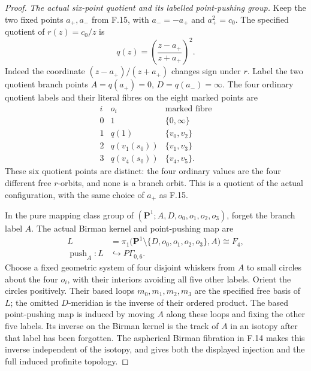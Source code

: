 \begin{proof}
\emph{The actual six-point quotient and its labelled point-pushing group.}
Keep the two fixed points $a_+,a_-$ from F.15,
with $a_-=-a_+$ and $a_+^2=c_0$.
The specified quotient of $r(z)=c_0/z$ is
\[
    q(z)=\left(\frac{z-a_+}{z+a_+}\right)^2.
                                                               \tag{F.16.4}
\]
Indeed the coordinate $(z-a_+)/(z+a_+)$ changes
sign under $r$.  Label the two quotient branch
points $A=q(a_+)=0$, $D=q(a_-)=\infty$.
The four ordinary quotient labels and their
literal fibres on the eight marked points are
\[
\begin{array}{c|c|c}
 i&o_i&\text{marked fibre}\\ \hline
 0&1&\{0,\infty\}\\
 1&q(1)&\{v_0,v_2\}\\
 2&q(v_1(s_0))&\{v_1,v_3\}\\
 3&q(v_4(s_0))&\{v_4,v_5\}.
\end{array}                                                     \tag{F.16.5}
\]
These six quotient points are distinct: the four
ordinary values are the four different free
$r$-orbits, and none is a branch orbit.
This is a quotient of the actual configuration,
with the same choice of $a_+$ as F.15.

In the pure mapping class group of
$(\mathbf P^1;A,D,o_0,o_1,o_2,o_3)$,
forget the branch label $A$.  The actual Birman
kernel and point-pushing map are
\[
 \begin{split}
 L&=\pi_1\bigl(\mathbf P^1\setminus
                    \{D,o_0,o_1,o_2,o_3\},A\bigr)\cong F_4,\\
 \operatorname{push}_A:L&\hookrightarrow P\Gamma_{0,6}.
 \end{split}                                                    \tag{F.16.6}
\]
Choose a fixed geometric system of four disjoint
whiskers from $A$ to small circles about the four
$o_i$, with their interiors avoiding all five
other labels.  Orient the circles positively.
Their based loops $m_0,m_1,m_2,m_3$ are the
specified free basis of $L$; the omitted
$D$-meridian is the inverse of their ordered
product.  The based point-pushing map is induced
by moving $A$ along these loops and fixing
the other five labels.  Its inverse on the
Birman kernel is the track of $A$ in an isotopy
after that label has been forgotten.  The
aspherical Birman fibration in F.14 makes this
inverse independent of the isotopy, and gives
both the displayed injection and the full
induced profinite topology.


\end{proof}
